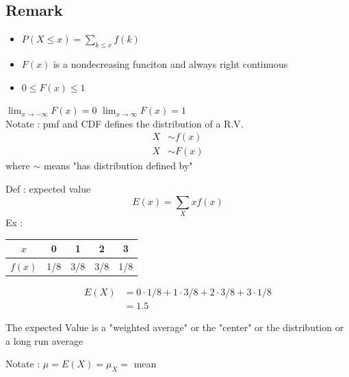     \subsection*{Remark}
    \begin{itemize}
	\item $P(X \le x) = \sum\limits_{k \le x} f(k)$
	\item $F(x)$ is a nondecreasing funciton and always right continuous
	\item $0 \le F(x) \le 1$
    \end{itemize}
    
    \begin{theo}
	$\lim_{x \to -\infty} F(x) = 0$  $\lim_{x \to \infty} F(x) = 1$ \\
	Notate : pmf and CDF defines the distribution of a R.V.
	\begin{align*}
	    X &\sim f(x) \\
	    X &\sim F(x)
	\end{align*}
	where $\sim$ means "has distribution defined by"
    \end{theo}	

    Def : expected value
    \[
	E(x) = \sum\limits_{X} xf(x)
    \] 
    Ex : 
    \begin{table}[H]
        \centering
        \label{tab:expect}
        \begin{tabular}{c|cccc}
	    $x$ & 0 & 1 & 2 & 3 \\
	    \hline
	    $f(x)$ & 1/8 & 3/8 & 3/8 & 1/8
        \end{tabular}
    \end{table}
    \begin{align*}
	E(X) &= 0 \cdot 1/8 + 1 \cdot 3/8 + 2 \cdot 3/8 + 3 \cdot 1/8 \\
	&= 1.5
    \end{align*}

    The expected Value is a "weighted average" or the "center" or the distribution or a long run average

    Notate : $\mu = E(X) = \mu_X = $ mean

